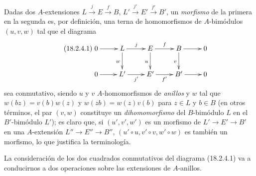 \begin{env}[18.2.4]
\label{0.18.2.4-fr}
Dadas dos $A$-extensiones
$L\xrightarrow{j}E\xrightarrow{f}B$,
$L'\xrightarrow{j'}E'\xrightarrow{f'}B'$, un \emph{morfismo} de la primera
en la segunda es, por definición, una terna de homomorfismos de
$A$-bimódulos $(u,v,w)$ tal que el diagrama
\begin{equation}
\label{0.18.2.4.1-fr}
\tag{18.2.4.1}
  \xymatrix{
    0\ar[r] & L\ar[r]^j\ar[d]_w & E\ar[r]^f\ar[d]_u
      & B\ar[r]\ar[d]_v & 0\\
    0\ar[r] & L'\ar[r]_{j'} & E'\ar[r]_{f'} & B'\ar[r] & 0
  }
\end{equation}
sea conmutativo, siendo $u$ y $v$ $A$-homomorfismos de \emph{anillos} y
$w$ tal que $w(bz)=v(b)w(z)$ y $w(zb)=w(z)v(b)$ para $z\in L$ y
$b\in B$ (en otros términos, el par $(v,w)$ constituye un
\emph{dihomomorfismo} del $B$-bimódulo $L$ en el $B'$-bimódulo $L'$); es
claro que, si $(u',v',w')$ es un morfismo de
$L'\to E'\to B'$ en una $A$-extensión $L''\to E''\to B''$,
$(u'\circ u,v'\circ v,w'\circ w)$ es también un morfismo, lo que justifica la
terminología.

La consideración de los dos cuadrados conmutativos del diagrama (18.2.4.1) va a
conducirnos a dos operaciones sobre las extensiones de $A$-anillos.
\end{env}

